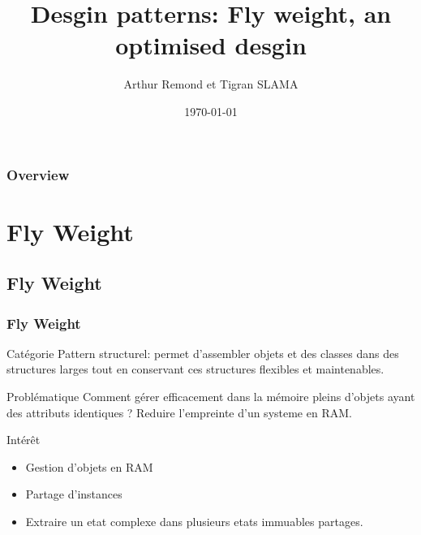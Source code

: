 \documentclass{beamer}
\title[Desgin pattern Fly Weight]{Desgin patterns: Fly weight, an optimised desgin} %
\author{Arthur Remond et Tigran SLAMA} %
\institute[ULCO] %
{
Universite du Littoral Cote d'Opale \\ %
\medskip
\textit{} %
}
\date{\today} %
\begin{document}
\begin{frame}
\titlepage %
\end{frame}

\begin{frame}
\frametitle{Overview} %
\tableofcontents %
\end{frame}


\section{Fly Weight}

\subsection{Fly Weight}
\begin{frame}
\frametitle{Fly Weight}
\begin{block}{Catégorie}
Pattern structurel: permet d'assembler objets et des classes dans des structures larges tout en conservant ces structures flexibles et maintenables.
\end{block}
\begin{block}{Problématique}
Comment gérer efficacement dans la mémoire pleins d'objets ayant des attributs identiques ? Reduire l'empreinte d'un systeme en RAM.
\end{block}
\begin{block}{Intérêt}
\begin{itemize}
\item Gestion d'objets en RAM
\item Partage d'instances
\item Extraire un etat complexe dans plusieurs etats immuables partages.
\end{itemize}
\end{block}
\end{frame}
\end{document}
